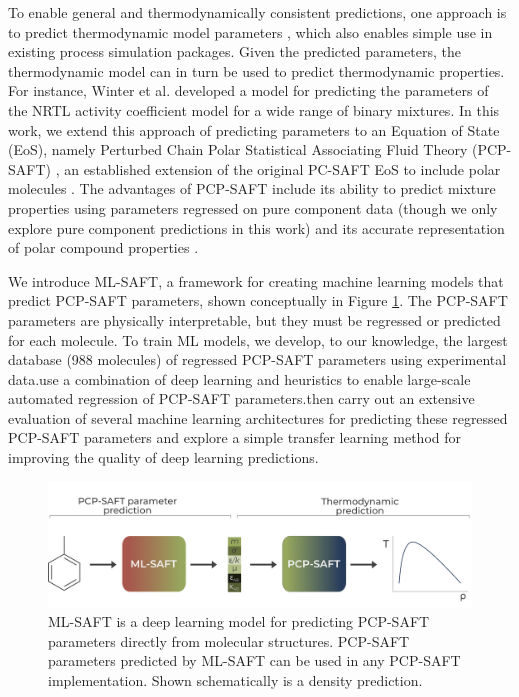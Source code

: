 To enable general and thermodynamically consistent predictions, one approach is to predict thermodynamic model parameters \cite{Abbasi2020, Matsukawa2021, Madani2021, Abdallahelhadj2022, Winter2022}, which also enables simple use in existing process simulation packages. Given the predicted parameters, the thermodynamic model can in turn be used to predict thermodynamic properties. For instance, Winter et al. \cite{Winter2022} developed a model for predicting the parameters of the NRTL activity coefficient model for a wide range of binary mixtures. In this work, we extend this approach of predicting parameters to an Equation of State (EoS), namely Perturbed Chain Polar Statistical Associating Fluid Theory (PCP-SAFT) \cite{Gross2006}, an established extension of the original PC-SAFT EoS to include polar molecules \cite{Gross2001}. The advantages of PCP-SAFT include its ability to predict mixture properties using parameters regressed on pure component data (though we only explore pure component predictions in this work) and its accurate representation of polar compound properties \cite{Cripwell2017}. 

We introduce ML-SAFT, a framework for creating machine learning models that predict PCP-SAFT parameters, shown conceptually in Figure \ref{fig:ML-SAFT_workflow}. The PCP-SAFT parameters are physically interpretable, but they must be regressed or predicted for each molecule. To train ML models, we develop, to our knowledge, the largest database (988 molecules) of regressed PCP-SAFT parameters using experimental data.use a combination of deep learning and heuristics to enable large-scale automated regression of PCP-SAFT parameters.then carry out an extensive evaluation of several machine learning architectures for predicting these regressed PCP-SAFT parameters and explore a simple transfer learning method for improving the quality of deep learning predictions.

\begin{figure}
    \centering
    \includegraphics[width=\textwidth]{gfx/Chapter08/mlsaft_workflow.png}
    \caption{ML-SAFT is a deep learning model for predicting PCP-SAFT parameters directly from molecular structures. PCP-SAFT parameters predicted by ML-SAFT can be used in any PCP-SAFT implementation. Shown schematically is a density prediction.}
    \label{fig:ML-SAFT_workflow}
\end{figure}

